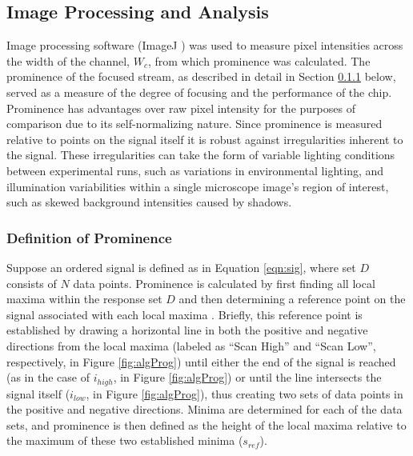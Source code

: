 \subsection{Image Processing and Analysis}
\label{sec:img}
Image processing software (ImageJ \cite{imagej}) was used to measure pixel intensities across the width of the channel, $W_c$, from which prominence was calculated. The prominence of the focused stream, as described in detail in Section \ref{ssec:prom} below, served as a measure of the degree of focusing and the performance of the chip. Prominence has advantages over raw pixel intensity for the purposes of comparison due to its self-normalizing nature. Since prominence is measured relative to points on the signal itself it is robust against irregularities inherent to the signal. These irregularities can take the form of variable lighting conditions between experimental runs, such as variations in environmental lighting, and illumination variabilities within a single microscope image's region of interest, such as skewed background intensities caused by shadows. 



\subsubsection{Definition of Prominence}
\label{ssec:prom}
Suppose an ordered signal is defined as in Equation \ref{eqn:sig}, where set $D$ consists of $N$ data points. Prominence is calculated by first finding all local maxima within the response set $D$ and then determining a reference point on the signal associated with each local maxima \cite{freeman1977corner}\cite{arge2013algorithms}. Briefly, this reference point is established by drawing a horizontal line in both the positive and negative directions from the local maxima (labeled as ``Scan High'' and ``Scan Low'', respectively, in Figure \ref{fig:algProg}) until either the end of the signal is reached (as in the case of $i_{high}$, in Figure \ref{fig:algProg}) or until the line intersects the signal itself ($i_{low}$, in Figure \ref{fig:algProg}), thus creating two sets of data points in the positive and negative directions. Minima are determined for each of the data sets, and prominence is then defined as the height of the local maxima relative to the maximum of these two established minima ($s_{ref}$). 


